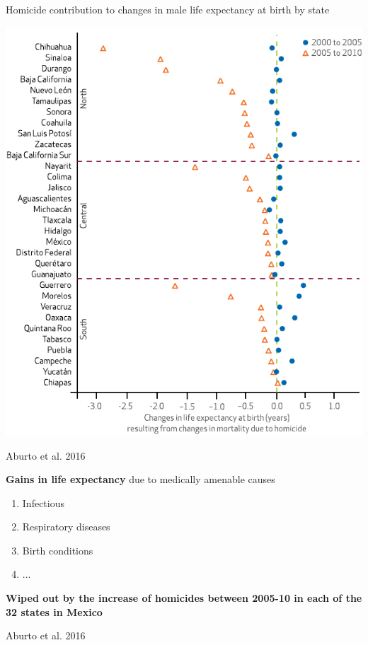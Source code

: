 \documentclass[xcolor={dvipsnames}]{beamer}
\begin{document}
\begin{frame}
	\begin{center}
		\Large{Homicide contribution to changes in male life expectancy at birth by state}
	\end{center}


	\begin{center}
		\includegraphics[scale=.62]{Figures/State_homicides_2}
	\end{center}
	
	\tiny{Aburto et al. 2016}				
\end{frame}

\begin{frame}
	\LARGE{

		\begin{center}		
			\textbf{Gains in life expectancy} due to medically amenable causes
		\end{center}
		
		\begin{enumerate}
			\item Infectious
			\item Respiratory diseases 
			\item Birth conditions
			\item ...
		\end{enumerate}

	\pause

	\begin{center}
		\textbf{Wiped out by the increase of homicides between 2005-10 in each of the 32 states in Mexico}
	\end{center}				
	\tiny{Aburto et al. 2016}			
}
\end{frame}
\end{document}
